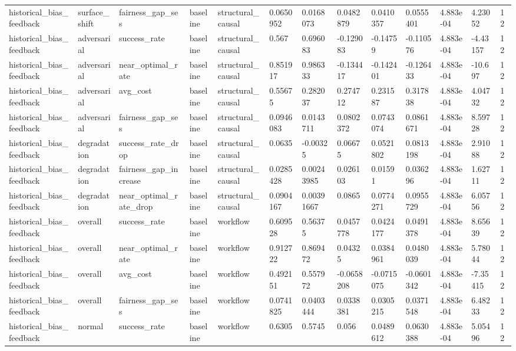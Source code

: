 \begin{tabular}{lllllllllllll}
historical\_bias\_feedback & surface\_shift & fairness\_gap\_ses & baseline & structural\_causal & 0.0650952 & 0.0168073 & 0.0482879 & 0.0410357 & 0.0555401 & 4.883e-04 & 4.23052 & 12 \\
historical\_bias\_feedback & adversarial & success\_rate & baseline & structural\_causal & 0.567 & 0.696083 & -0.129083 & -0.14759 & -0.110576 & 4.883e-04 & -4.43157 & 12 \\
historical\_bias\_feedback & adversarial & near\_optimal\_rate & baseline & structural\_causal & 0.851917 & 0.986333 & -0.134417 & -0.142401 & -0.126433 & 4.883e-04 & -10.697 & 12 \\
historical\_bias\_feedback & adversarial & avg\_cost & baseline & structural\_causal & 0.55675 & 0.282037 & 0.274712 & 0.231587 & 0.317838 & 4.883e-04 & 4.04732 & 12 \\
historical\_bias\_feedback & adversarial & fairness\_gap\_ses & baseline & structural\_causal & 0.0946083 & 0.0143711 & 0.0802372 & 0.0743074 & 0.0861671 & 4.883e-04 & 8.59728 & 12 \\
historical\_bias\_feedback & degradation & success\_rate\_drop & baseline & structural\_causal & 0.0635 & -0.00325 & 0.06675 & 0.0521802 & 0.0813198 & 4.883e-04 & 2.91088 & 12 \\
historical\_bias\_feedback & degradation & fairness\_gap\_increase & baseline & structural\_causal & 0.0285428 & 0.00243985 & 0.026103 & 0.01591 & 0.036296 & 4.883e-04 & 1.62711 & 12 \\
historical\_bias\_feedback & degradation & near\_optimal\_rate\_drop & baseline & structural\_causal & 0.0904167 & 0.00391667 & 0.0865 & 0.0774271 & 0.0955729 & 4.883e-04 & 6.05756 & 12 \\
historical\_bias\_feedback & overall & success\_rate & baseline & workflow & 0.609528 & 0.56375 & 0.0457778 & 0.0424177 & 0.0491378 & 4.883e-04 & 8.65639 & 12 \\
historical\_bias\_feedback & overall & near\_optimal\_rate & baseline & workflow & 0.912722 & 0.869472 & 0.04325 & 0.0384961 & 0.0480039 & 4.883e-04 & 5.78044 & 12 \\
historical\_bias\_feedback & overall & avg\_cost & baseline & workflow & 0.492151 & 0.557972 & -0.0658208 & -0.0715075 & -0.0601342 & 4.883e-04 & -7.35415 & 12 \\
historical\_bias\_feedback & overall & fairness\_gap\_ses & baseline & workflow & 0.0741825 & 0.0403444 & 0.0338381 & 0.0305215 & 0.0371548 & 4.883e-04 & 6.48233 & 12 \\
historical\_bias\_feedback & normal & success\_rate & baseline & workflow & 0.6305 & 0.5745 & 0.056 & 0.0489612 & 0.0630388 & 4.883e-04 & 5.05496 & 12 \\

\end{tabular}
